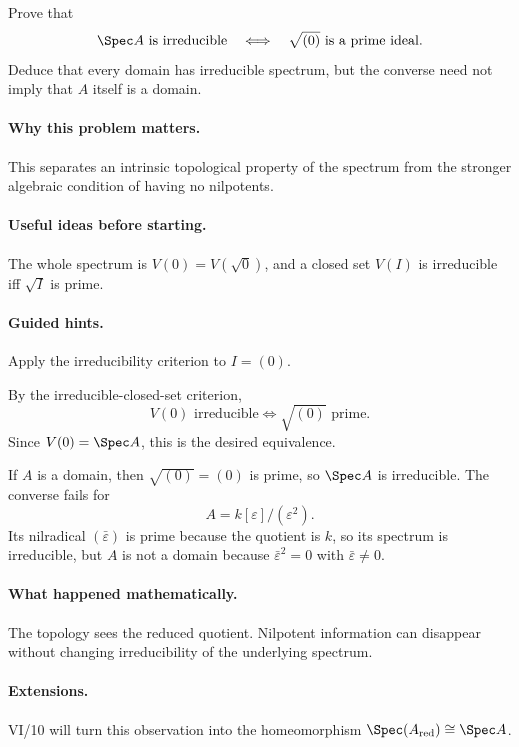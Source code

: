 \begin{problem}
Prove that
\[
\Spec A\text{ is irreducible}
\quad\Longleftrightarrow\quad
\sqrt{(0)}\text{ is a prime ideal}.
\]
Deduce that every domain has irreducible spectrum, but the converse need not imply that $A$
itself is a domain.
\end{problem}

\paragraph{Why this problem matters.}
This separates an intrinsic topological property of the spectrum from the stronger algebraic
condition of having no nilpotents.

\paragraph{Useful ideas before starting.}
The whole spectrum is $V(0)=V(\sqrt0)$, and a closed set $V(I)$ is irreducible iff
$\sqrt I$ is prime.

\paragraph{Guided hints.}
Apply the irreducibility criterion to $I=(0)$.

\begin{solution}
By the irreducible-closed-set criterion,
\[
V(0)\text{ irreducible}
\iff
\sqrt{(0)}\text{ prime}.
\]
Since $V(0)=\Spec A$, this is the desired equivalence.

If $A$ is a domain, then $\sqrt{(0)}=(0)$ is prime, so $\Spec A$ is irreducible.
The converse fails for
\[
A=k[\varepsilon]/(\varepsilon^2).
\]
Its nilradical $(\bar\varepsilon)$ is prime because the quotient is $k$, so its spectrum is
irreducible, but $A$ is not a domain because $\bar\varepsilon^2=0$ with
$\bar\varepsilon\neq0$.
\end{solution}

\paragraph{What happened mathematically.}
The topology sees the reduced quotient.  Nilpotent information can disappear without changing
irreducibility of the underlying spectrum.

\paragraph{Extensions.}
VI/10 will turn this observation into the homeomorphism
$\Spec(A_{\mathrm{red}})\cong\Spec A$.
